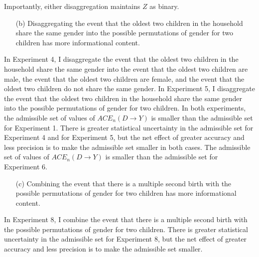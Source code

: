\documentclass[10pt,a4paper,twoside]{article}
\numberwithin{equation}{section}
\begin{document}
Importantly, either disaggregation maintains $Z$ as binary. 
\begin{enumerate}
\item[(b)] Disaggregating the event that the oldest two children in the household share the same gender into the possible permutations of gender for two children has more informational content.
\end{enumerate}
In Experiment 4, I disaggregate the event that the oldest two children in the household share the same gender into the event that the oldest two children are male, the event that the oldest two children are female, and the event that the oldest two children do not share the same gender. In Experiment 5, I disaggregate the event that the oldest two children in the household share the same gender into the possible permutations of gender for two children. In both experiments, the admissible set of values of $ACE_n(D\rightarrow Y)$ is smaller than the admissible set for Experiment 1. There is greater statistical uncertainty in the admissible set for Experiment 4 and for Experiment 5, but the net effect of greater accuracy and less precision is to make the admissible set smaller in both cases. The admissible set of values of $ACE_n(D\rightarrow Y)$ is smaller than the admissible set for Experiment 6. 
\begin{enumerate}
\item[(c)] Combining the event that there is a multiple second birth with the possible permutations of gender for two children has more informational content. 
\end{enumerate}
In Experiment 8, I combine the event that there is a multiple second birth with the possible permutations of gender for two children. There is greater statistical uncertainty in the admissible set for Experiment 8, but the net effect of greater accuracy and less precision is to make the admissible set smaller. 
\end{document}
